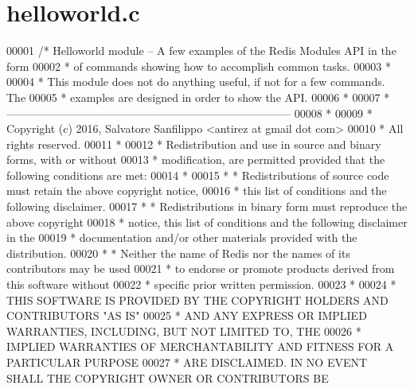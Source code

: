 \hypertarget{helloworld_8c_source}{}\section{helloworld.\+c}
\label{helloworld_8c_source}

\begin{DoxyCode}
00001 \textcolor{comment}{/* Helloworld module -- A few examples of the Redis Modules API in the form}
00002 \textcolor{comment}{ * of commands showing how to accomplish common tasks.}
00003 \textcolor{comment}{ *}
00004 \textcolor{comment}{ * This module does not do anything useful, if not for a few commands. The}
00005 \textcolor{comment}{ * examples are designed in order to show the API.}
00006 \textcolor{comment}{ *}
00007 \textcolor{comment}{ * -----------------------------------------------------------------------------}
00008 \textcolor{comment}{ *}
00009 \textcolor{comment}{ * Copyright (c) 2016, Salvatore Sanfilippo <antirez at gmail dot com>}
00010 \textcolor{comment}{ * All rights reserved.}
00011 \textcolor{comment}{ *}
00012 \textcolor{comment}{ * Redistribution and use in source and binary forms, with or without}
00013 \textcolor{comment}{ * modification, are permitted provided that the following conditions are met:}
00014 \textcolor{comment}{ *}
00015 \textcolor{comment}{ *   * Redistributions of source code must retain the above copyright notice,}
00016 \textcolor{comment}{ *     this list of conditions and the following disclaimer.}
00017 \textcolor{comment}{ *   * Redistributions in binary form must reproduce the above copyright}
00018 \textcolor{comment}{ *     notice, this list of conditions and the following disclaimer in the}
00019 \textcolor{comment}{ *     documentation and/or other materials provided with the distribution.}
00020 \textcolor{comment}{ *   * Neither the name of Redis nor the names of its contributors may be used}
00021 \textcolor{comment}{ *     to endorse or promote products derived from this software without}
00022 \textcolor{comment}{ *     specific prior written permission.}
00023 \textcolor{comment}{ *}
00024 \textcolor{comment}{ * THIS SOFTWARE IS PROVIDED BY THE COPYRIGHT HOLDERS AND CONTRIBUTORS "AS IS"}
00025 \textcolor{comment}{ * AND ANY EXPRESS OR IMPLIED WARRANTIES, INCLUDING, BUT NOT LIMITED TO, THE}
00026 \textcolor{comment}{ * IMPLIED WARRANTIES OF MERCHANTABILITY AND FITNESS FOR A PARTICULAR PURPOSE}
00027 \textcolor{comment}{ * ARE DISCLAIMED. IN NO EVENT SHALL THE COPYRIGHT OWNER OR CONTRIBUTORS BE}

\end{DoxyCode}
